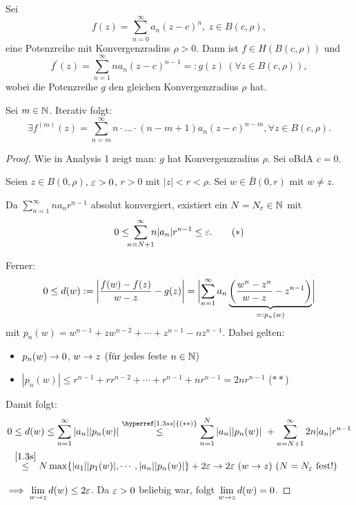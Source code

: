 \documentclass[a4paper,twoside,DIV15,BCOR12mm]{scrbook}
\begin{document}
\begin{satz} \label{satz1.3} Sei
\[f(z) = \sum_{n=0}^\infty a_n(z-c)^n,\ z\in B(c,\rho),\]
eine Potenzreihe mit Konvergenzradius $\rho > 0$. Dann ist $f\in H(B(c,\rho))$ und
\[f^\prime(z) = \sum_{n=1}^\infty n a_n(z-c)^{n-1} =: g(z)\ (\forall z\in B(c,\rho)),\]
wobei die Potenzreihe $g$ den gleichen Konvergenzradius $\rho$ hat.

Sei $m\in\mathbb{N}$. Iterativ folgt:
\[\exists f^{(m)}(z) = \sum_{n=m}^\infty n\cdot\dotsc\cdot (n-m+1) a_n(z-c)^{n-m}, \forall z\in B(c,\rho).\]
\end{satz}
\begin{proof} Wie in Analysis 1 zeigt man: $g$ hat Konvergenzradius $\rho$. Sei oBdA $c = 0$.

Seien $z\in B(0,\rho)$, $\varepsilon>0$, $r>0$ mit $|z|<r<\rho$. Sei $w\in \bar{B}(0,r)$ mit $w\neq z$.

Da $\sum_{n=1}^\infty na_nr^{n-1}$ absolut konvergiert, existiert ein $N = N_\varepsilon\in\mathbb{N}$ mit
\begin{equation}\label{1.3s}0 \leq\!\!\! \sum_{n=N+1}^\infty\!\!\! n |a_n| r^{n-1} \leq \varepsilon.\tag{$*$}\end{equation}

Ferner:
\[0\leq d(w) := \biggl\lvert\frac{f(w)-f(z)}{w-z} - g(z)\biggr\rvert = \biggl\lvert\sum_{n=1}^\infty a_n\underbrace{\left(\frac{w^n-z^n}{w-z} - z^{n-1}\right)}_{=: p_n(w)}\biggr\rvert\]
mit $p_n(w) = w^{n-1}+zw^{n-2}+\dotsb+z^{n-1}-nz^{n-1}$.
Dabei gelten:
\begin{itemize}
\item $p_n(w) \rightarrow 0$, $w\rightarrow z$ (für jedes feste $n\in\mathbb{N}$)
\item \label{1.3ss}$|p_n(w)| \leq r^{n-1} + rr^{n-2} + \dotsb + r^{n-1} + nr^{n-1} = 2nr^{n-1}$ \hfill($\ast\ast$)
\end{itemize}

Damit folgt:
\begin{align*}
0&\leq d(w) \leq \sum_{n=1}^\infty |a_n||p_n(w)| \stackrel{\hyperref[1.3ss]{(**)}}{\leq} \sum_{n=1}^N |a_n||p_n(w)|\ + \sum_{n=N+1}^\infty 2n|a_n|r^{n-1}\\
&\stackrel{\eqref{1.3s}}{\leq} N \max\{|a_1||p_1(w)|,\dotsb,|a_n||p_n(w)|\} + 2\ep \ra 2\ep\ (w\ra z)\ (N = N_\ep\ \text{fest!})
\end{align*}

$\displaystyle\implies \lim_{w\rightarrow z} d(w) \leq 2\varepsilon$. Da $\varepsilon>0$ beliebig war, folgt $\displaystyle\lim_{w\rightarrow z} d(w) = 0$.
\end{proof}
\end{document}
